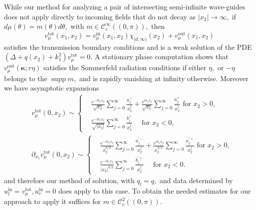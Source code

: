 \documentclass[11pt]{article}
\newcommand\tot{\operatorname{tot}}\newcommand\scat{\operatorname{sc}}
\newcommand\In{\operatorname{in}}
\newcommand\out{\operatorname{out}}
\newcommand\bkappa{\boldsymbol \kappa}
\newcommand\cC{\mathcal{C}}
\newcommand\pa{\partial}
\newcommand\supp{\operatorname{supp}}
\theoremstyle{definition}
\theoremstyle{remark}
\begin{document}
While our method for analyzing a pair of intersecting semi-infinite wave-guides
does not apply directly to incoming fields that do not decay as $|x_2|\to\infty,$ if
$d\mu(\theta)=m(\theta)d\theta,$ with $m\in\cC^{\infty}_c((0,\pi)),$ then
$$v^{\tot}_{\mu}(x_1,x_2)=v^{\In}_{\mu}(x_1,x_2)\chi_{[d,\infty)}(x_2)+v^{\out}_{\mu}(x_1,x_2)$$
  satisfies the transmission boundary conditions and is a weak solution of the PDE
  $(\Delta+q(x_2)+k_1^2)v^{\tot}_{\mu}=0.$ A stationary phase computation shows
  that $v^{\out}_{\mu}(\bkappa;r\eta)$ satisfies the Sommerfeld radiation
  conditions if either $\eta,$ or $-\eta$ belongs to the $\supp m,$ and is
  rapidly  vanishing at infinity otherwise. Moreover we have asymptotic
  expansions
\begin{equation}\label{eqn174.210} 
  \begin{split}
 & v^{\tot}_{\mu}(0,x_2)\sim
  \begin{cases}
    & \frac{e^{-ik_1x_2}}{\sqrt{x_2}}\sum\limits_{j=0}^{\infty}\frac{a_j^-}{x_2^j}+
    \frac{e^{ik_1x_2}}{\sqrt{x_2}}\sum\limits_{j=0}^{\infty}\frac{a_j^+}{x_2^j}\text{ for }x_2>0,\\
    &  \frac{e^{-ik_1x_2}}{\sqrt{|x_2|}}\sum\limits_{j=0}^{\infty}\frac{b_j^+}{x_2^j}\quad\text{ for }x_2<0,
  \end{cases}\\
 &  \pa_{x_1}v^{\tot}_{\mu}(0,x_2)\sim
  \begin{cases}
    & \frac{e^{-ik_1x_2}}{x^{3/2}_2}\sum\limits_{j=0}^{\infty}\frac{a_j^{'-}}{x_2^j}+
    \frac{e^{ik_1x_2}}{x_2^{3/2}}\sum\limits_{j=0}^{\infty}\frac{a_j^{'+}}{x_2^j}\text{ for }x_2>0,\\
    &  \frac{e^{-ik_1x_2}}{|x_2|^{3/2}}\sum\limits_{j=0}^{\infty}\frac{b_j^{'+}}{x_2^j}\quad\text{ for }x_2<0.
  \end{cases}
  \end{split}
\end{equation}
and therefore our method of solution, with $q_l=q,$ and data determined by
$u^{\In}_l=v^{\tot}_{\mu}, u^{\In}_r=0$ does apply to this case.  To obtain the
needed estimates for our approach to apply it suffices for
$m\in\cC^{2}_c((0,\pi)).$
\end{document}
